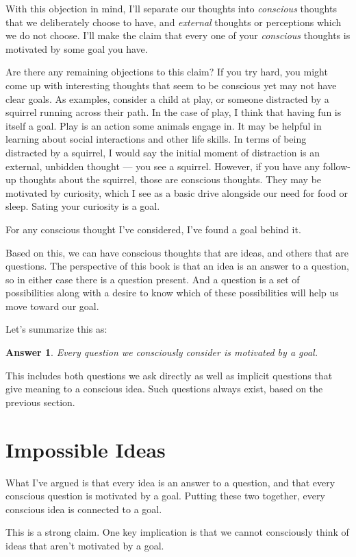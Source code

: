 \documentclass[9pt, twoside]{book}
\newtheorem*{answer}{Answer}
\theoremstyle{argtstyle}
\begin{document}
With this objection in mind, I'll separate our thoughts into
{\em conscious} thoughts that we deliberately choose to have,
and {\em external} thoughts or perceptions which we do not choose.
I'll make the claim that every one of your {\em conscious}
thoughts
is motivated by some goal you have.

Are there any remaining objections to this claim?
If you try hard, you might come up with interesting 
thoughts that seem to be conscious yet may not have
clear goals. As examples, consider a child at play, or
someone distracted by a squirrel running across their path.
In the case of play, I think that having fun is itself a goal.
Play is an action some animals engage in.
It may be helpful in learning about social interactions and
other life skills.
In terms of being distracted by a squirrel,
I would say the initial moment of distraction is an
external, unbidden thought --- you see a squirrel. However,
if you have any follow-up thoughts about the squirrel, those
are conscious thoughts. They may be motivated by
curiosity, which I see as a basic drive alongside
our need for food or sleep.
Sating your curiosity is a goal.

For any conscious thought I've considered, I've
found a goal behind it.

Based on this, we can have conscious thoughts that are ideas, and others that
are questions. The perspective of this book is that an idea is an answer to a
question, so in either case there is a question present. And a question is a set
of possibilities along with a desire to know which of these possibilities will
help us move toward our goal.

Let's summarize this as:
\begin{answer}
    Every question we consciously consider is motivated by a goal.
\end{answer}
This includes both questions we ask directly as well as
implicit questions that give meaning to a conscious idea.
Such questions always exist, based on the previous
section.

\section{Impossible Ideas}

What I've argued is that every idea is an answer to a question, and that every
conscious question is motivated by a goal. Putting these two together,
every
conscious idea is connected to a goal.

This is a strong claim. One key implication is that we cannot consciously
think of ideas that aren't motivated by a goal.
\end{document}
